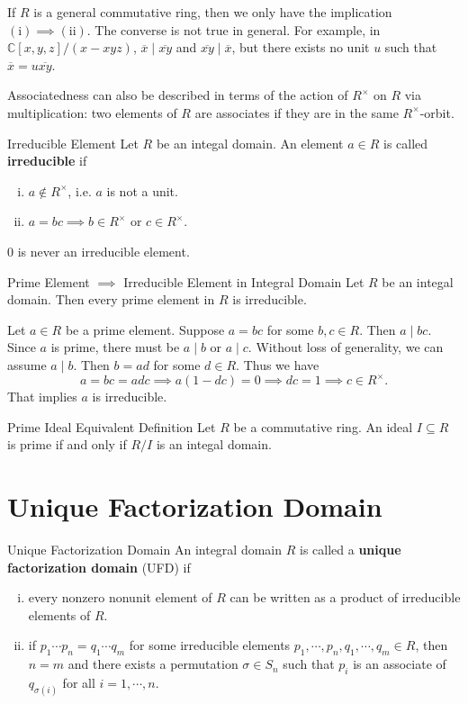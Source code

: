 If $R$ is a general commutative ring, then we only have the implication $(\mathrm i)\implies (\mathrm{ii})$. The converse is not true in general. For example, in $\mathbb{C}[x,y,z]/(x-xyz)$, $\overline{x}\mid \overline{xy}$ and $\overline{xy}\mid \overline{x}$, but there exists no unit $u$ such that $\overline{x}=u\overline{xy}$.

Associatedness can also be described in terms of the action of $R^\times$ on $R$ via multiplication: two elements of $R$ are associates if they are in the same $R^\times$-orbit.
\begin{definition}{Irreducible Element}{}
    Let $R$ be an integal domain. An element $a\in R$ is called \textbf{irreducible} if
    \begin{enumerate}[(i)]
        \item $a\notin R^\times$, i.e. $a$ is not a unit.
        \item $a=bc\implies b\in R^\times\text{ or }c\in R^\times$.
    \end{enumerate}    
\end{definition}

0 is never an irreducible element.
\begin{proposition}{Prime Element $\implies$ Irreducible Element in Integral Domain}{}
    Let $R$ be an integal domain. Then every prime element in $R$ is irreducible.
\end{proposition}

\begin{prf}
    Let $a\in R$ be a prime element. Suppose $a=bc$ for some $b,c\in R$. Then $a\mid bc$. Since $a$ is prime, there must be $a\mid b$ or $a\mid c$. Without loss of generality, we can assume $a\mid b$. Then $b=ad$ for some $d\in R$. Thus we have $$a=bc=adc\implies a(1-dc)=0\implies dc=1\implies c\in R^\times.$$ That implies $a$ is irreducible.
\end{prf}

\begin{proposition}{Prime Ideal Equivalent Definition}{}
    Let $R$ be a commutative ring. An ideal $I\subseteq R$ is prime if and only if $R/I$ is an integal domain.
\end{proposition}


\section{Unique Factorization Domain}
\begin{definition}{Unique Factorization Domain}{}
    An integral domain $R$ is called a \textbf{unique factorization domain} (UFD) if
    \begin{enumerate}[(i)]
        \item every nonzero nonunit element of $R$ can be written as a product of irreducible elements of $R$.
        \item if $p_1\cdots p_n=q_1\cdots q_m$ for some irreducible elements $p_1,\cdots,p_n,q_1,\cdots,q_m\in R$, then $n=m$ and there exists a permutation $\sigma\in S_n$ such that $p_i$ is an associate of $q_{\sigma(i)}$ for all $i=1,\cdots,n$.
    \end{enumerate}
\end{definition}

